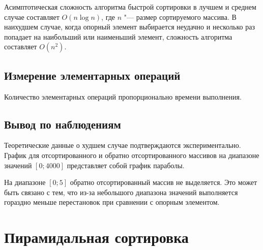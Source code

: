 \documentclass[11pt]{article}
\begin{document}
\begin{center}
\end{center}
{ \hspace*{\fill} }

Асимптотическая сложность алгоритма быстрой сортировки в лучшем и среднем случае составляет $O(n\log n)$, где $n$ "--- размер сортируемого массива. В наихудшем случае, когда опорный
элемент выбирается неудачно и несколько раз попадает на наибольший или наименьший элемент, сложность алгоритма составляет $O(n^2)$.

\subsection{Измерение элементарных операций}

\begin{center}
\end{center}
{ \hspace*{\fill} }

\begin{center}
\end{center}
{ \hspace*{\fill} }

Количество элементарных операций пропорционально времени выполнения.

\subsection{Вывод по наблюдениям}

Теоретические данные о худшем случае подтверждаются экспериментально. График для отсортированного
и обратно отсортированного массивов на диапазоне значений $\left[0;4000\right]$ представляет собой график параболы.

На диапазоне $\left[0;5\right]$ обратно отсортированный массив не выделяется. Это может быть связано с тем,
что из-за небольшого диапазона значений выполняется гораздно меньше перестановок при сравнении с опорным элементом.

\newpage

\setcounter{section}{11}
\section*{\centering Пирамидальная сортировка}
\end{document}
